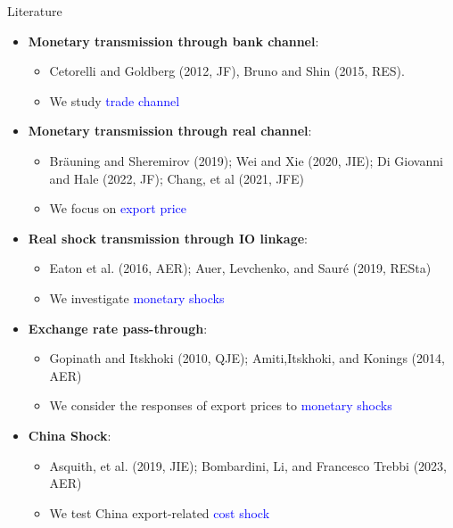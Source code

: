 \documentclass[10pt]{beamer}
\begin{document}
\begin{frame}{Literature}

\begin{itemize}
\item \textbf{Monetary transmission through bank channel}: 
    \begin{itemize}
        \item Cetorelli and Goldberg (2012, JF), Bruno and Shin (2015, RES).
        \item We study \textcolor{blue}{trade channel}
    \end{itemize} 
\item \textbf{Monetary transmission through real channel}: 
    \begin{itemize}
        \item Bräuning and Sheremirov (2019); Wei and Xie (2020, JIE); Di Giovanni and Hale (2022, JF); Chang, et al (2021, JFE)
        \item We focus on \textcolor{blue}{export price}
    \end{itemize}
\item \textbf{Real shock transmission through IO linkage}: 
    \begin{itemize}
        \item Eaton et al. (2016, AER); Auer, Levchenko, and Sauré (2019, RESta)
        \item We investigate \textcolor{blue}{monetary shocks}
    \end{itemize}

\item \textbf{Exchange rate pass-through}:
	\begin{itemize}
		\item Gopinath and Itskhoki (2010, QJE); Amiti,Itskhoki, and Konings (2014, AER)
            \item We consider the responses of export prices to \textcolor{blue}{monetary shocks}
	\end{itemize}
\item \textbf{China Shock}:
	\begin{itemize}
		\item Asquith, et al. (2019, JIE); Bombardini, Li, and Francesco Trebbi (2023, AER)
            \item We test China export-related \textcolor{blue}{cost shock}
	\end{itemize}
\end{itemize}
    

 
\end{frame}
\end{document}
